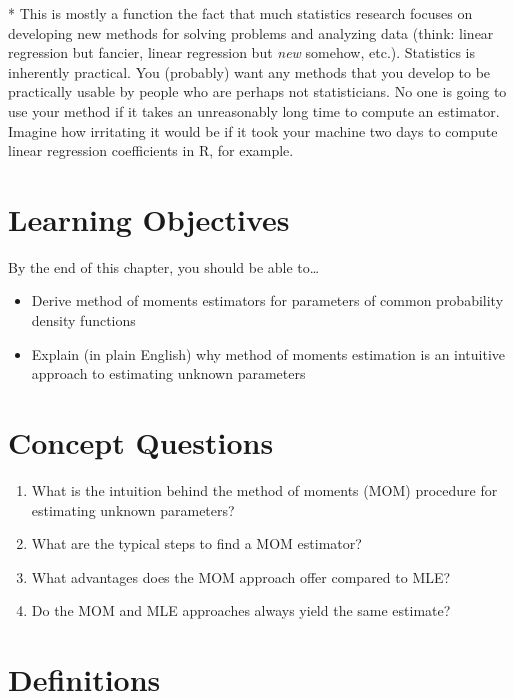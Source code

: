 \documentclass[
  letterpaper,
  DIV=11,
  numbers=noendperiod]{scrreprt}
\begin{document}
* This is mostly a function the fact that much statistics research
focuses on developing new methods for solving problems and analyzing
data (think: linear regression but fancier, linear regression but
\emph{new} somehow, etc.). Statistics is inherently practical. You
(probably) want any methods that you develop to be practically usable by
people who are perhaps not statisticians. No one is going to use your
method if it takes an unreasonably long time to compute an estimator.
Imagine how irritating it would be if it took your machine two days to
compute linear regression coefficients in R, for example.

\section{Learning Objectives}\label{learning-objectives-2}

By the end of this chapter, you should be able to\ldots{}

\begin{itemize}
\item
  Derive method of moments estimators for parameters of common
  probability density functions
\item
  Explain (in plain English) why method of moments estimation is an
  intuitive approach to estimating unknown parameters
\end{itemize}

\section{Concept Questions}\label{concept-questions-2}

\begin{enumerate}
\def\labelenumi{\arabic{enumi}.}
\item
  What is the intuition behind the method of moments (MOM) procedure for
  estimating unknown parameters?
\item
  What are the typical steps to find a MOM estimator?
\item
  What advantages does the MOM approach offer compared to MLE?
\item
  Do the MOM and MLE approaches always yield the same estimate?
\end{enumerate}

\section{Definitions}\label{definitions-2}
\end{document}
